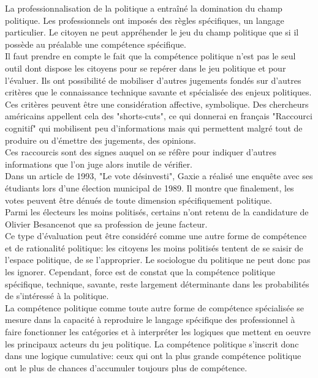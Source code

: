 \documentclass[12pt, a4paper, openany]{book}
\begin{document}
La professionnalisation de la politique a entraîné la domination du champ politique. Les professionnels ont imposés des règles spécifiques, un langage particulier. Le citoyen ne peut appréhender le jeu du champ politique que si il possède au préalable une compétence spécifique. \\
Il faut prendre en compte le fait que la compétence politique n'est pas le seul outil dont dispose les citoyens pour se repérer dans le jeu politique et pour l'évaluer. Ils ont possibilité de mobiliser d'autres jugements fondés sur d'autres critères que le connaissance technique savante et spécialisée des enjeux politiques. \\
Ces critères peuvent être une considération affective, symbolique. Des chercheurs américains appellent cela des "shorts-cuts", ce qui donnerai en français "Raccourci cognitif" qui mobilisent peu d'informations mais qui permettent malgré tout de produire ou d'émettre des jugements, des opinions. \\
Ces raccourcis sont des signes auquel on se réfère pour indiquer d'autres informations que l'on juge alors inutile de vérifier. \\
Dans un article de 1993, "Le vote désinvesti", Gaxie a réalisé une enquête avec ses étudiants lors d'une élection municipal de 1989. Il montre que finalement, les votes peuvent être dénués de toute dimension spécifiquement politique. \\
Parmi les électeurs les moins politisés, certains n'ont retenu de la candidature de Olivier Besancenot que sa profession de jeune facteur. \\
Ce type d'évaluation peut être considéré comme une autre forme de compétence et de rationalité politique: les citoyens les moins politisés tentent de se saisir de l'espace politique, de se l'approprier. Le sociologue du politique ne peut donc pas les ignorer. Cependant, force est de constat que la compétence politique spécifique, technique, savante, reste largement déterminante dans les probabilités de s'intéressé à la politique. \\
La compétence politique comme toute autre forme de compétence spécialisée se mesure dans la capacité à reproduire le langage spécifique des professionnel à faire fonctionner les catégories et à interpréter les logiques que mettent en oeuvre les principaux acteurs du jeu politique. La compétence politique s'inscrit donc dans une logique cumulative: ceux qui ont la plus grande compétence politique ont le plus de chances d'accumuler toujours plus de compétence. 
\end{document}
